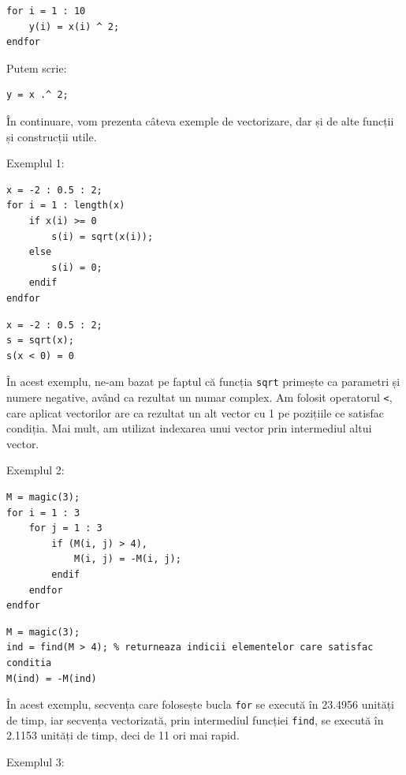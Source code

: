 \documentclass{exam}
\begin{document}
\begin{lstlisting}
for i = 1 : 10
	y(i) = x(i) ^ 2;
endfor
\end{lstlisting}

\par Putem scrie:

\begin{lstlisting}
y = x .^ 2;
\end{lstlisting}

\par În continuare, vom prezenta câteva exemple de vectorizare, dar și de alte
funcții și construcții utile.

\newpage
\par Exemplul 1:

\begin{lstlisting}
x = -2 : 0.5 : 2;
for i = 1 : length(x)
	if x(i) >= 0
		s(i) = sqrt(x(i));
	else
		s(i) = 0;
 	endif
endfor
\end{lstlisting}

\begin{lstlisting}
x = -2 : 0.5 : 2;
s = sqrt(x);
s(x < 0) = 0
\end{lstlisting}

\par În acest exemplu, ne-am bazat pe faptul că funcția \verb|sqrt| primește ca
parametri și numere negative, având ca rezultat un numar complex. Am folosit
operatorul \verb|<|, care aplicat vectorilor are ca rezultat un alt vector cu 1
pe pozițiile ce satisfac condiția. Mai mult, am utilizat indexarea unui vector
prin intermediul altui vector.

\par Exemplul 2:

\begin{lstlisting}
M = magic(3);
for i = 1 : 3
	for j = 1 : 3
		if (M(i, j) > 4),
			M(i, j) = -M(i, j);
		endif
	endfor
endfor
\end{lstlisting}

\begin{lstlisting}
M = magic(3);
ind = find(M > 4); % returneaza indicii elementelor care satisfac conditia
M(ind) = -M(ind)
\end{lstlisting}

\par În acest exemplu, secvența care folosește bucla \verb|for| se execută în 23.4956
unități de timp, iar secvența vectorizată, prin intermediul funcției \verb|find|, se
execută în 2.1153 unități de timp, deci de 11 ori mai rapid.

\par Exemplul 3:
\end{document}
